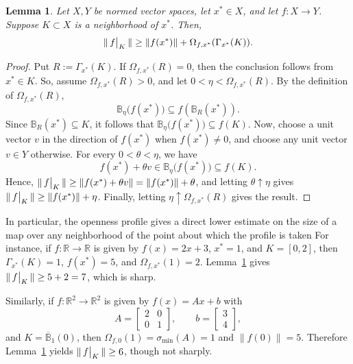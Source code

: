 \documentclass[pdflatex,sn-mathphys-num]{sn-jnl}%
\newcommand{\restr}[2]
    {
    \left.\kern-\nulldelimiterspace
    #1 
    \vphantom{\big|}
    \right|_{#2}
    }
\theoremstyle{thmstyleone}%
\newtheorem{lemma}[theorem]{Lemma}
\theoremstyle{thmstyletwo}%
\theoremstyle{thmstylethree}%
\begin{document}

    \begin{lemma}\label{norm est}
        Let \(X,Y\) be normed vector spaces, let \(x^*\in X\), and let
        \(f:X\to Y\). Suppose \(K\subset X\) is a neighborhood of \(x^*\). Then,
        \[
            \|\restr{f}{K}\|
            \geq
            \|f(x^*)\|+\Omega_{f,x^*}(\Gamma_{x^*}(K)).
        \]
    \end{lemma}


    \begin{proof}
        Put \(R:=\Gamma_{x^*}(K)\). If \(\Omega_{f,x^*}(R)=0\), then the conclusion follows from $x^*\in K$. So, assume $\Omega_{f,x^*}(R)>0$, and let $0<\eta<\Omega_{f,x^*}(R)$.  By the definition of \(\Omega_{f,x^*}(R)\),
        \[
            \mathbb B_{\eta}\big(f(x^*)\big)
            \subseteq
            f(\mathbb B_R(x^*)).
        \]
        Since \(\mathbb B_R(x^*)\subseteq K\), it follows that $\mathbb B_{\eta}\big(f(x^*)\big)\subseteq f(K)$.  Now, choose a unit vector \(v\) in the direction of \(f(x^*)\) when
        \(f(x^*)\neq 0\), and choose any unit vector \(v\in Y\) otherwise. For every
        \(0<\theta<\eta\), we have
        \[
            f(x^*)+\theta v\in \mathbb B_{\eta}\big(f(x^*)\big)\subseteq f(K).
        \]
        Hence, $\|\restr{f}{K}\| \geq \|f(x^*)+\theta v\| = \|f(x^*)\|+\theta$, and letting \(\theta\uparrow \eta\) gives $\|\restr{f}{K}\| \geq \|f(x^*)\|+\eta$.  Finally, letting \(\eta\uparrow \Omega_{f,x^*}(R)\) gives the result.
    \end{proof}


    In particular, the openness profile gives a direct lower estimate on the size of a map over any neighborhood of the point about which the profile is taken  For instance, if $f:\mathbb{R}\rightarrow \mathbb{R}$ is given by $f(x)=2x+3$, $x^*=1$, and $K=[0,2]$, then $\Gamma_{x^*}(K)=1$, $f(x^*)=5$, and $\Omega_{f,x^*}(1)=2$.  Lemma~\ref{norm est} gives $\|\restr{f}{K}\|\geq 5+2=7$, which is sharp.

    Similarly, if $f:\mathbb{R}^2\rightarrow \mathbb{R}^2$ is given by $f(x)=Ax+b$ with
    $$
        A=\begin{bmatrix}2&0\\0&1\end{bmatrix},\qquad b=\begin{bmatrix}3\\4\end{bmatrix},
    $$
    and $K=\overline{\mathbb{B}}_1(0)$, then $\Omega_{f,0}(1)=\sigma_{\min}(A)=1$ and $\|f(0)\|=5$.  Therefore Lemma~\ref{norm est} yields $\|\restr{f}{K}\|\geq 6$, though not sharply.
\end{document}
